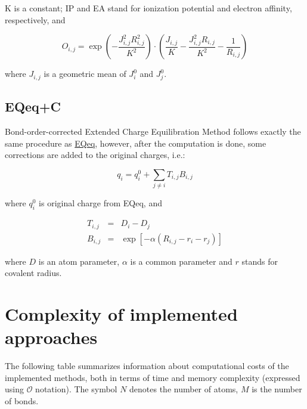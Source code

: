 \documentclass[oneside]{memoir}
\newcommand\ddfrac[2]{\frac{\displaystyle #1}{\displaystyle #2}}
\begin{document}
K is a constant; IP and EA stand for ionization potential and electron affinity, respectively, and

\begin{equation}
\label{eq:eqeq_overlap}
O_{i, j} = \exp{\left(-\ddfrac{J_{i, j}^2R_{i, j}^2}{K^2}\right)}\cdot\left(\ddfrac{J_{i, j}}{K} - \ddfrac{J_{i, j}^2R_{i, j}}{K^2} - \ddfrac{1}{R_{i, j}}\right)
\end{equation}

where $J_{i, j}$ is a geometric mean of $J_i^0$ and $J_j^0$.

\section*{EQeq+C}
Bond-order-corrected Extended Charge Equilibration Method \cite{MartinNoble2015} follows exactly the same procedure as \hyperref[sec:methods_eqeq]{EQeq}, however, after the computation is done, some corrections are added to the original charges, i.e.:

\begin{equation}
\label{eq:eqeqc_main}
q_i = q_i^0 + \sum_{j \neq i} T_{i, j}B_{i, j}
\end{equation}

where $q_i^0$ is original charge from EQeq, and

\begin{eqnarray}
\label{eq:eqeqc_terms}
T_{i, j} &=& D_i - D_j\\ 
B_{i, j} &=& \exp\left[-\alpha\left(R_{i, j} - r_i - r_j\right)\right]
\end{eqnarray}

where $D$ is an atom parameter, $\alpha$ is a common parameter and $r$ stands for covalent radius.

\chapter*{Complexity of implemented approaches}

The following table summarizes information about computational costs of the implemented methods, both in terms of time and memory complexity (expressed using ${\mathcal O}$ notation). The symbol $N$ denotes the number of atoms, $M$ is the number of bonds.
\bigskip
\end{document}
